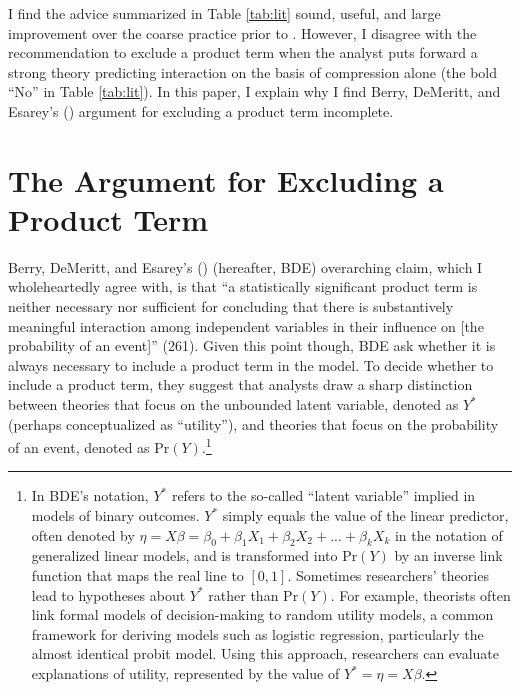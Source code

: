 \documentclass[12pt]{article}
\begin{document}
I find the advice summarized in Table \ref{tab:lit} sound, useful, and large improvement over the coarse practice prior to \cite{BerryDeMerittEsarey2010}. However, I disagree with the recommendation to exclude a product term when the analyst puts forward a strong theory predicting interaction on the basis of compression alone (the bold ``No'' in Table \ref{tab:lit}). In this paper, I explain why I find Berry, DeMeritt, and Esarey's (\citeyear{BerryDeMerittEsarey2010}) argument for excluding a product term incomplete.

\section*{The Argument for Excluding a Product Term}

Berry, DeMeritt, and Esarey's (\citeyear{BerryDeMerittEsarey2010}) (hereafter, BDE) overarching claim, which I wholeheartedly agree with, is that ``a statistically significant product term is neither necessary nor sufficient for concluding that there is substantively meaningful interaction among independent variables in their influence on [the probability of an event]'' (261). Given this point though, BDE ask whether it is always necessary to include a product term in the model. To decide whether to include a product term, they suggest that analysts draw a sharp distinction between theories that focus on the unbounded latent variable, denoted as $Y^*$ (perhaps conceptualized as ``utility''), and theories that focus on the probability of an event, denoted as $\text{Pr}(Y)$.\footnote{In BDE's notation, $Y^*$ refers to the so-called ``latent variable'' implied in models of binary outcomes. $Y^*$ simply equals the value of the linear predictor, often denoted by $\eta = X\beta = \beta_0 + \beta_1X_1 + \beta_2X_2 + ... + \beta_kX_k$ in the notation of generalized linear models, and is transformed into $\text{Pr}(Y)$ by an inverse link function that maps the real line to $[0, 1]$. Sometimes researchers' theories lead to hypotheses about $Y^*$ rather than $\text{Pr}(Y)$. For example, theorists often link formal models of decision-making to random utility models, a common framework for deriving models such as logistic regression, particularly the almost identical probit model. Using this approach, researchers can evaluate explanations of utility, represented by the value of $Y^* = \eta = X\beta$.}
\end{document}
